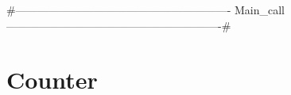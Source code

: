 {#----------------------------------------------------------
 Main_call
----------------------------------------------------------#}
\section{Counter}